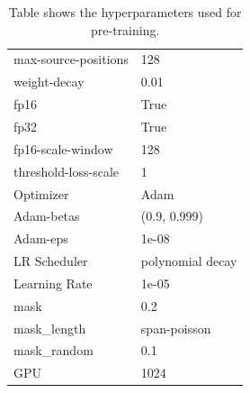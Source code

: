 \documentclass{article} %
\begin{document}
\begin{table}[h]
\begin{tabular}{@{}ll@{}}
max-source-positions        & 128                   \\
weight-decay                & 0.01                  \\
fp16                        & True        \\
fp32                        & True        \\
fp16-scale-window           & 128        \\
threshold-loss-scale        & 1           \\
Optimizer                   & Adam                      \\
Adam-betas                  & (0.9, 0.999)              \\
Adam-eps                    & 1e-08                 \\
LR Scheduler                & polynomial decay          \\
Learning Rate               & 1e-05                     \\
mask	& 0.2 \\
mask\_length	& span-poisson \\
mask\_random	& 0.1 \\
GPU	& 1024 \\
\bottomrule
\end{tabular}
\quad

\caption{Table shows the hyperparameters used for pre-training.}
\label{tab:hyperparams-pretrain}
\end{table}
\end{document}
